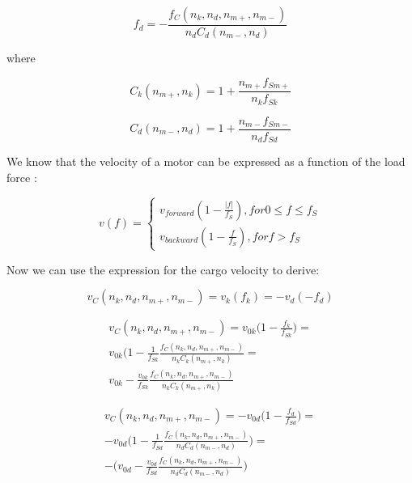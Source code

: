 \begin{equation}
f_d = -\frac{f_C(n_k, n_d, n_{m+}, n_{m-})}{n_dC_d(n_{m-},n_d)}
\end{equation}

where

\begin{equation}
C_k(n_{m+}, n_k) = 1 + \frac{n_{m+}f_{Sm+}}{n_kf_{Sk}}
\end{equation}

\begin{equation}
C_d(n_{m-},n_d) = 1 + \frac{n_{m-}f_{Sm-}}{n_df_{Sd}}
\end{equation}

We know that the velocity of a motor can be expressed as a function of the load force \cite{muller2008tug}:

\begin{equation}
v(f) = \left\{ \begin{aligned}
v_{forward} (1 - \frac{|f|}{f_S}), for 0 \leq  f \leq f_S\\
v_{backward} (1 - \frac{f}{f_S}), for f > f_S
\end{aligned}\right.
\end{equation}

Now we can use the expression for the cargo velocity to derive:

\begin{equation}
v_C(n_k, n_d, n_{m+}, n_{m-}) = v_k(f_k) = - v_d(-f_d)
\end{equation}

\begin{equation}
\begin{split}
v_C(n_k, n_d, n_{m+}, n_{m-}) = v_{0k}\big(1-\frac{f_k}{f_{Sk}}\big) =\\
v_{0k}\big(1-\frac{1}{f_{Sk}}\frac{f_C(n_k, n_d, n_{m+}, n_{m-})}{n_kC_k(n_{m+}, n_k)} = \\
v_{0k}-\frac{v_{0k}}{f_{Sk}}\frac{f_C(n_k, n_d, n_{m+}, n_{m-})}{n_kC_k(n_{m+}, n_k)}
\end{split}
\end{equation}

\begin{equation}
\begin{split}
v_C(n_k, n_d, n_{m+}, n_{m-}) = -v_{0d}\big(1-\frac{f_d}{f_{Sd}}\big) =\\ -v_{0d}\big(1-\frac{1}{f_{Sd}}\frac{f_C(n_k, n_d, n_{m+}, n_{m-})}{n_dC_d(n_{m-},n_d)}\big) = \\
-\big(v_{0d}-\frac{v_{0d}}{f_{Sd}}\frac{f_C(n_k, n_d, n_{m+}, n_{m-})}{n_dC_d(n_{m-},n_d)}\big)
\end{split}
\end{equation}


